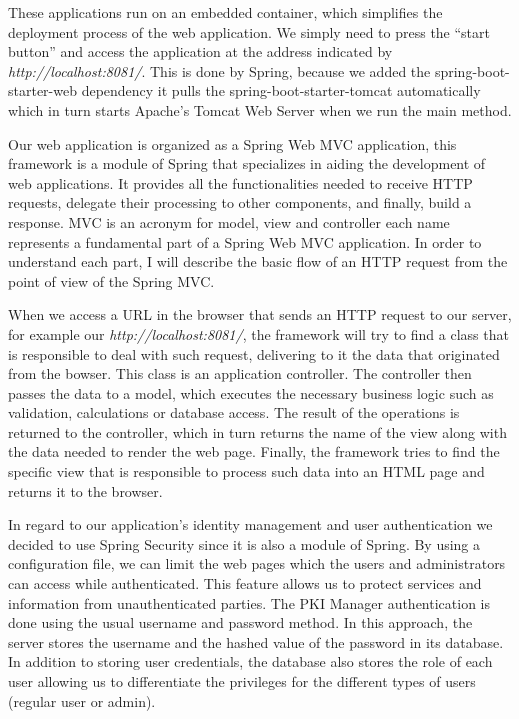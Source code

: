 These applications run on an embedded container, which simplifies the deployment process of the web application. We simply need to press the “start button” and access the application at the address indicated by \textit{http://localhost:8081/}. This is done by Spring, because we added the spring-boot-starter-web dependency it pulls the spring-boot-starter-tomcat automatically which in turn starts Apache’s Tomcat Web Server when we run the main method.

Our web application is organized as a Spring Web MVC application, this framework is a module of Spring that specializes in aiding the development of web applications. It provides all the functionalities needed to receive HTTP requests, delegate their processing to other components, and finally, build a response. MVC is an acronym for model, view and controller each name represents a fundamental part of a Spring Web MVC application. In order to understand each part, I will describe the basic flow of an HTTP request from the point of view of the Spring MVC.

When we access a URL in the browser that sends an HTTP request to our server, for example our \textit{http://localhost:8081/}, the framework will try to find a class that is responsible to deal with such request, delivering to it the data that originated from the bowser. This class is an application controller. The controller then passes the data to a model, which executes the necessary business logic such as validation, calculations or database access. The result of the operations is returned to the controller, which in turn returns the name of the view along with the data needed to render the web page. Finally, the framework tries to find the specific view that is responsible to process such data into an HTML page and returns it to the browser. 

In regard to our application's identity management and user authentication we decided to use Spring Security since it is also a module of Spring. By using a configuration file, we can limit the web pages which the users and administrators can access while authenticated. This feature allows us to protect services and information from unauthenticated parties. The PKI Manager authentication is done using the usual username and password method. In this approach, the server stores the username and the hashed value of the password in its database. In addition to storing user credentials, the database also stores the role of each user allowing us to differentiate the privileges for the different types of users (regular user or admin). 

